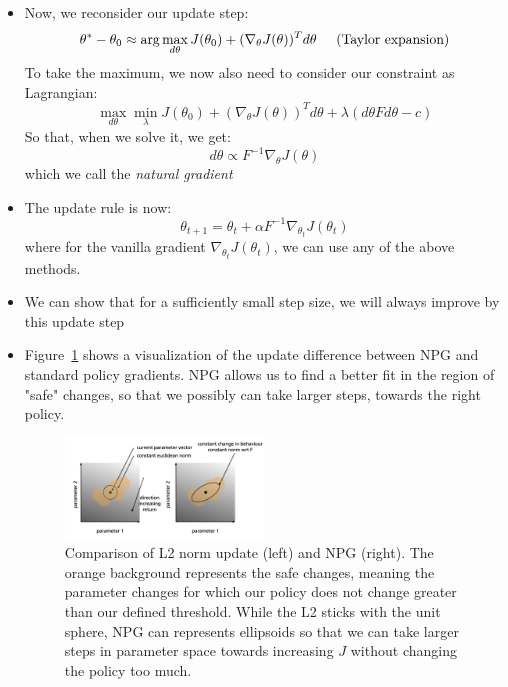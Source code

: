 \begin{itemize}
	\item Now, we reconsider our update step:
	\begin{equation*}
		\begin{split}
			\theta^{*}-\theta_0 & \approx \arg\max_{d\theta} J(\theta_0) + (\nabla_{\theta} J(\theta))^T d\theta \hspace{5mm}\text{(Taylor expansion)}\\
		\end{split}
	\end{equation*}
	To take the maximum, we now also need to consider our constraint as Lagrangian:
	$$\max_{d\theta}\min_{\lambda} J(\theta_0) + (\nabla_{\theta} J(\theta))^T d\theta + \lambda (d\theta F d\theta-c)$$
	So that, when we solve it, we get:
	$$d\theta  \propto F^{-1}\nabla_{\theta}J(\theta)$$
	which we call the \textit{natural gradient}
	\item The update rule is now:
	$$\theta_{t+1} = \theta_t + \alpha F^{-1}\nabla_{\theta_t}J(\theta_t)$$
	where for the vanilla gradient $\nabla_{\theta_t}J(\theta_t)$, we can use any of the above methods.
	\item We can show that for a sufficiently small step size, we will always improve by this update step 
	\item Figure~\ref{fig:rl_policy_gradients_NPG} shows a visualization of the update difference between NPG and standard policy gradients. NPG allows us to find a better fit in the region of "safe" changes, so that we possibly can take larger steps, towards the right policy.
	
	\begin{figure}[ht!]
		\centering
		\includegraphics[width=0.5\textwidth]{figures/rl_policy_gradients_NPG.png}
		\caption{Comparison of L2 norm update (left) and NPG (right). The orange background represents the safe changes, meaning the parameter changes for which our policy does not change greater than our defined threshold. While the L2 sticks with the unit sphere, NPG can represents ellipsoids so that we can take larger steps in parameter space towards increasing $J$ without changing the policy too much.}
		\label{fig:rl_policy_gradients_NPG}
	\end{figure}


\end{itemize}
